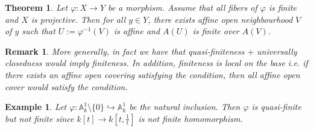 \documentclass{ctexart}
\newtheorem{remark}{Remark}[section]
\newtheorem{theorem}{Theorem}[section]
\newtheorem{example}{Example}[section]
\begin{document}
\begin{theorem}
    Let $\varphi: X \rightarrow Y$ be a morphism.
    Assume that all fibers of $\varphi$ is finite and $X$ is projective.
    Then for all $y\in Y$, there exists affine open neighbourhood $V$ of $y$ such that $U := \varphi^{-1}(V) $ is affine and $A(U)$ is finite over $A(V)$.
    \label{Theorem 4.9}
\end{theorem}
\begin{remark}
    More generally, in fact we have that quasi-finiteness $+$ universally closedness would imply finiteness.
    In addition, finiteness is local on the base i.e. if there exists an affine open covering satisfying the condition,
    then all affine open cover would satisfy the condition.
\end{remark}
\begin{example}
    Let $\varphi: \mathbb{A}_{k}^{1} \setminus \{0\} \hookrightarrow \mathbb{A}_{k}^{1}$ be the natural inclusion.
    Then $\varphi$ is quasi-finite but not finite since $k[t] \rightarrow k[t, \frac{1}{t}]$ is not finite homomorphism.
\end{example}
\end{document}
